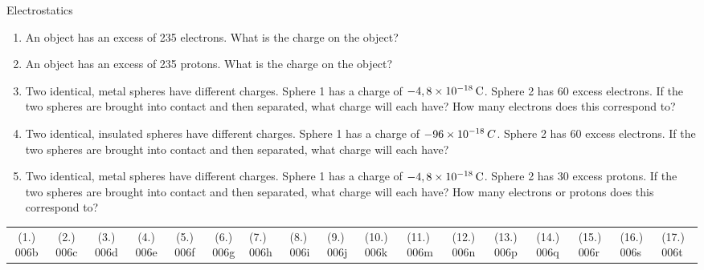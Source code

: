 \begin{eocexercises}{Electrostatics}
\begin{enumerate}[noitemsep, label=\textbf{\arabic*}. ]
            \item An object has an excess of 235 electrons. What is the charge on the object?\newline
            \item An object has an excess of 235 protons. What is the charge on the object?\newline
            \item Two identical, metal spheres have different charges. Sphere 1 has a charge of 
$-4,8\ensuremath{\times}{10}^{-18}\phantom{\rule{2pt}{0ex}}\text{C}$. Sphere 2 has 60 excess electrons. If the two spheres are brought into contact and then separated, what charge will each have? How many electrons does this correspond to?\newline
            \item Two identical, insulated spheres have different charges. Sphere 1 has a charge of 
$-96\ensuremath{\times}{10}^{-18}\phantom{\rule{2pt}{0ex}}C$. Sphere 2 has 60 excess electrons. If the two spheres are brought into contact and then separated, what charge will each have? \newline
            \item Two identical, metal spheres have different charges. Sphere 1 has a charge of 
$-4,8\ensuremath{\times}{10}^{-18}\phantom{\rule{2pt}{0ex}}\text{C}$. Sphere 2 has 30 excess protons. If the two spheres are brought into contact and then separated, what charge will each have? How many electrons or protons does this correspond to?\newline
            \end{enumerate}
  \label{m38781**end}
  \label{464e844ca5615087ea89d9d95dd9a43a**end}
\par \practiceinfo
 \par \begin{tabular}[h]{cccccc}
 (1.) 006b  &  (2.) 006c  &  (3.) 006d  &  (4.) 006e  &  (5.) 006f  &  (6.) 006g  &  (7.) 006h  &  (8.) 006i  &  (9.) 006j  &  (10.) 006k  &  (11.) 006m  &  (12.) 006n  &  (13.) 006p  &  (14.) 006q  &  (15.) 006r  &  (16.) 006s  &  (17.) 006t  & \end{tabular}
\end{eocexercises}
